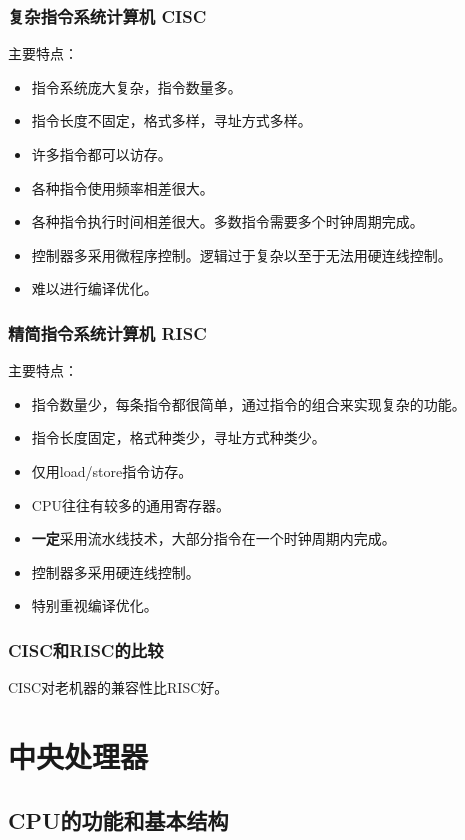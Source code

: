 \documentclass[12pt, a4paper, oneside]{ctexart}
\begin{document}
\subsubsection{复杂指令系统计算机 CISC}

主要特点：
\begin{itemize}
  \item 指令系统庞大复杂，指令数量多。
  \item 指令长度不固定，格式多样，寻址方式多样。
  \item 许多指令都可以访存。
  \item 各种指令使用频率相差很大。
  \item 各种指令执行时间相差很大。多数指令需要多个时钟周期完成。
  \item 控制器多采用微程序控制。逻辑过于复杂以至于无法用硬连线控制。
  \item 难以进行编译优化。
\end{itemize}

\subsubsection{精简指令系统计算机 RISC}

主要特点：
\begin{itemize}
  \item 指令数量少，每条指令都很简单，通过指令的组合来实现复杂的功能。
  \item 指令长度固定，格式种类少，寻址方式种类少。
  \item 仅用load/store指令访存。
  \item CPU往往有较多的通用寄存器。
  \item \textbf{一定}采用流水线技术，大部分指令在一个时钟周期内完成。
  \item 控制器多采用硬连线控制。
  \item 特别重视编译优化。
\end{itemize}

\subsubsection{CISC和RISC的比较}

CISC对老机器的兼容性比RISC好。

\section{中央处理器}

\subsection{CPU的功能和基本结构}
\end{document}
